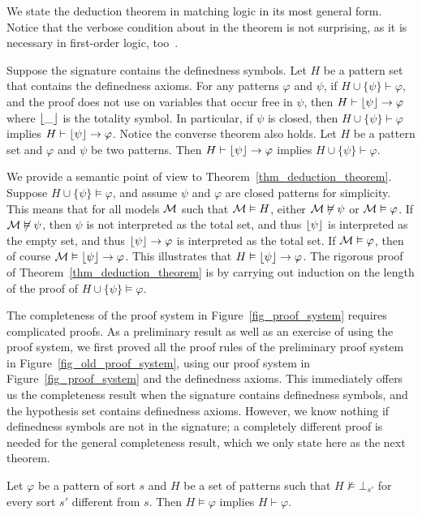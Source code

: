 \documentclass{amsart}
\begin{document}
We state the deduction theorem in matching logic in its most
general form.
Notice that
the verbose condition about \universalgeneralization
in the theorem is not surprising,
as it is necessary in first-order logic, too~\cite{hamilton1988logic}.
\begin{theorem}
\label{thm_deduction_theorem}
Suppose the signature contains the definedness symbols.
Let $H$ be a pattern set that contains
the definedness axioms.
For any patterns $\varphi$ and $\psi$,
if $H \cup \{ \psi \} \vdash \varphi$,
and the proof does not use
\universalgeneralization on variables that occur free in $\psi$,
then $H \vdash \lfloor\psi\rfloor \to \varphi$
where $\lfloor\_\rfloor$ is the totality symbol.
In particular, if $\psi$ is closed,
then $H \cup \{ \psi \} \vdash \varphi$
implies $H \vdash \lfloor\psi\rfloor \to \varphi$.
Notice the converse theorem also holds.
Let $H$ be a pattern set and $\varphi$ and $\psi$ be two patterns.
Then 
$H \vdash \lfloor\psi\rfloor \to \varphi$ implies
$H \cup \{ \psi \} \vdash \varphi$.
\end{theorem}

We provide a semantic point of view to Theorem~\ref{thm_deduction_theorem}.
Suppose $H \cup \{ \psi \} \vDash \varphi$,
and assume $\psi$ and $\varphi$ are closed patterns for simplicity.
This means that for all models $\mathcal{M}$ such that $\mathcal{M} \vDash H$,
either $\mathcal{M} \not\vDash \psi$ or $\mathcal{M} \vDash \varphi$.
If $\mathcal{M} \not\vDash \psi$,
then $\psi$ is not interpreted as the total set,
and thus $\lfloor\psi\rfloor$ is interpreted as the empty set,
and thus $\lfloor\psi\rfloor \to \varphi$ is interpreted as the total set.
If $\mathcal{M} \vDash \varphi$,
then of course $\mathcal{M} \vDash \lfloor\psi\rfloor \to \varphi$.
This illustrates that $H \vDash \lfloor\psi\rfloor \to \varphi$.
The rigorous proof of Theorem~\ref{thm_deduction_theorem}
is by carrying out induction on the length of the proof of
$H \cup \{ \psi \} \vDash \varphi$.




The completeness of the proof system in Figure~\ref{fig_proof_system}
requires complicated proofs.
As a preliminary result as well as an exercise of using
the proof system, 
we first proved all the proof rules of the preliminary proof system
in Figure~\ref{fig_old_proof_system},
using our proof system in Figure~\ref{fig_proof_system}
and the definedness axioms.
This immediately offers us the completeness result
when the signature contains definedness symbols, and 
the hypothesis set contains definedness axioms.
However, we know nothing if definedness symbols are not in the signature;
a completely different proof is needed for the general completeness result,
which we only state here as the next theorem.
\begin{theorem}
\label{thm_completeness}
Let $\varphi$ be a pattern of sort $s$ and $H$ 
be a set of patterns
such that $H \not\vDash \bot_{s'}$ for every sort $s'$ different from $s$.  
Then $H \vDash \varphi$ implies $H \vdash \varphi$.
\end{theorem}
\end{document}

